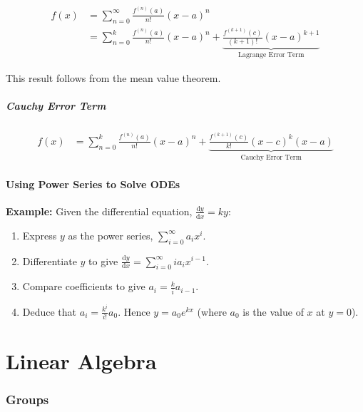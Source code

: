\documentclass[10pt,twoside,twocolumn]{article}
\begin{document}
\begin{align*}
f\left(x\right) & =\sum_{n=0}^{\infty}\frac{f^{\left(n\right)}\left(a\right)}{n!}\left(x-a\right)^{n}\\
 & =\sum_{n=0}^{k}\frac{f^{\left(n\right)}\left(a\right)}{n!}\left(x-a\right)^{n}+\underbrace{\frac{f^{\left(k+1\right)}\left(c\right)}{\left(k+1\right)!}\left(x-a\right)^{k+1}}_{\text{Lagrange Error Term}}
\end{align*}


This result follows from the mean value theorem.


\subsubsection{Cauchy Error Term}

\begin{align*}
f\left(x\right) & =\sum_{n=0}^{k}\frac{f^{\left(n\right)}\left(a\right)}{n!}\left(x-a\right)^{n}+\underbrace{\frac{f^{\left(k+1\right)}\left(c\right)}{k!}\left(x-c\right)^{k}\left(x-a\right)}_{\text{Cauchy Error Term}}
\end{align*}



\subsection{Using Power Series to Solve ODEs}

\textbf{Example:} Given the differential equation, $\frac{\text{d}y}{\text{d}x}=ky$: 
\begin{enumerate}
\item Express $y$ as the power series, $\sum_{i=0}^{\infty}a_{i}x^{i}$. 
\item Differentiate $y$ to give $\frac{\text{d}y}{\text{d}x}=\sum_{i=0}^{\infty}ia_{i}x^{i-1}$. 
\item Compare coefficients to give $a_{i}=\frac{k}{i}a_{i-1}$. 
\item Deduce that $a_{i}=\frac{k^{i}}{i!}a_{0}$. Hence $y=a_{0}e^{kx}$
(where $a_{0}$ is the value of $x$ at $y=0$). 
\end{enumerate}
\pagebreak{}


\part{Linear Algebra}


\section{Groups}
\end{document}
